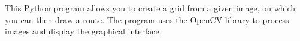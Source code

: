 This Python program allows you to create a grid from a given image, on which you can then draw a route. The program uses the Open\+CV library to process images and display the graphical interface. 